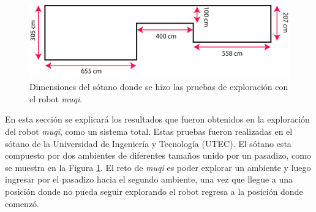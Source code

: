 \begin{figure}
  \centering \footnotesize
  \includegraphics[width=1.0\textwidth]{images/medidas_mapa.jpg}
  \captionsetup{font=footnotesize}
  \caption{Dimensiones del sótano donde se hizo las pruebas de exploración con 
  el robot \textit{muqi}.}
  \label{fig:DimensionesSotano}
\end{figure}

En esta sección se explicará los resultados que fueron obtenidos en la exploración 
del robot \textit{muqi}, como un sistema total. Estas pruebas fueron realizadas en
el sótano de la Universidad de Ingeniería y Tecnología (UTEC). El sótano esta 
compuesto por dos ambientes de diferentes tamaños unido por un pasadizo, como se 
muestra en la Figura \ref{fig:DimensionesSotano}. El reto de \textit{muqi} es poder 
explorar un ambiente y luego ingresar por el pasadizo hacia el segundo ambiente, una 
vez que llegue a una posición donde no pueda seguir explorando el robot regresa a la 
posición donde comenzó.



